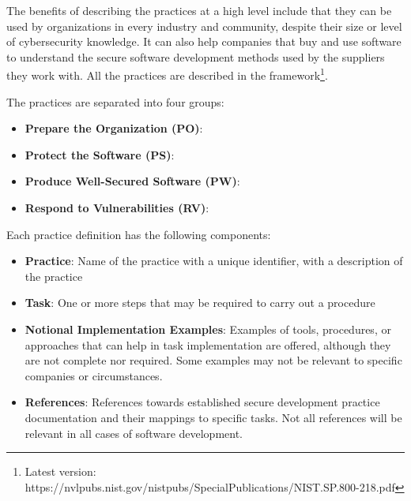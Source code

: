 The benefits of describing the practices at a high level include that they can be used by organizations in every industry and community, despite their size or level of cybersecurity knowledge. It can also help companies that buy and use software to understand the secure software development methods used by the suppliers they work with. All the practices are described in the framework\footnote{Latest version: https://nvlpubs.nist.gov/nistpubs/SpecialPublications/NIST.SP.800-218.pdf}.
\newpage


The practices are separated into four groups:
\begin{itemize}
  \item \textbf{Prepare the Organization (PO)}: \cite{ssdf}
  \item \textbf{Protect the Software (PS)}: \cite{ssdf}
  \item \textbf{Produce Well-Secured Software (PW)}: \cite{ssdf}
  \item \textbf{Respond to Vulnerabilities (RV)}: \cite{ssdf}
\end{itemize}

Each practice definition has the following components:
\begin{itemize}
  \item \textbf{Practice}: Name of the practice with a unique identifier, with a description of the practice 
  \item \textbf{Task}: One or more steps that may be required to carry out a procedure
  \item \textbf{Notional Implementation Examples}: Examples of tools, procedures, or approaches that can help in task implementation are offered, although they are not complete nor required. Some examples may not be relevant to specific companies or circumstances.
  \item \textbf{References}: References towards established secure development practice documentation and their mappings to specific tasks. Not all references will be relevant in all cases of software development. \cite{ssdf}
\end{itemize}



